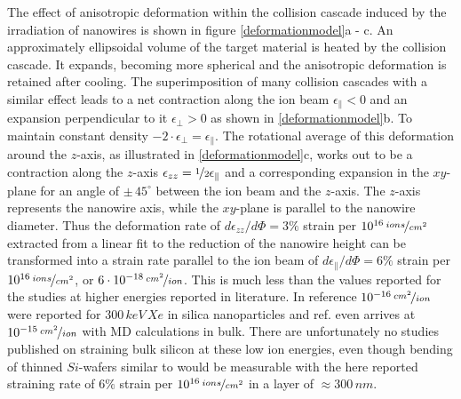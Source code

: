 The effect of anisotropic deformation within the collision cascade induced by the irradiation of nanowires is shown in figure \ref{deformationmodel}a - c. An approximately ellipsoidal volume of the target material is heated by the collision cascade. It expands, becoming more spherical and the anisotropic deformation is retained after cooling. The superimposition of many collision cascades with a similar effect leads to a net contraction along the ion beam $\epsilon_{\parallel} < 0$ and an expansion perpendicular to it $\epsilon_{\perp} > 0$ as shown in \ref{deformationmodel}b. To maintain constant density $-2\cdot\epsilon_{\perp} =  \epsilon_{\parallel}$. The rotational average of this deformation around the $z$-axis, as illustrated in \ref{deformationmodel}c, works out to be a contraction along the $z$-axis $\epsilon_{zz} = \nicefrac{1}{2} \epsilon_{\parallel}$ and a corresponding expansion in the $xy$-plane for an angle of $\pm\, 45^\circ$ between the ion beam and the $z$-axis. The $z$-axis represents the nanowire axis, while the $xy$-plane is parallel to the nanowire diameter. Thus the deformation rate of $d\epsilon_{zz}/d\Phi = 3\%$ strain per $10^{16}\,\nicefrac{ions}{cm^2}$ extracted from a linear fit to the reduction of the nanowire height can be transformed into a strain rate parallel to the ion beam of $d\epsilon_{\parallel}/d\Phi = 6\%$ strain per $10^{16}\,\nicefrac{ions}{cm^2}$, or $6\cdot 10^{-18}\,\nicefrac{cm^2}{ion}$. This is much less than the values reported for the studies at higher energies reported in literature. In reference \cite{dillen_ion_2003} $10^{-16}\,\nicefrac{cm^2}{ion}$ were reported for $300\,keV\,Xe$ in silica nanoparticles and ref. \cite{baumer_prediction_2014} even arrives at $10^{-15}\,\nicefrac{cm^2}{ion}$ with MD calculations in bulk. There are unfortunately no studies published on straining bulk silicon at these low ion energies, even though bending of thinned $Si$-wafers similar to \cite{volkert_stress_1991,massl_stress_2008} would be measurable with the here reported straining rate of $6\%$ strain per $10^{16}\,\nicefrac{ions}{cm^2}$ in a layer of $\approx 300\,nm$.


